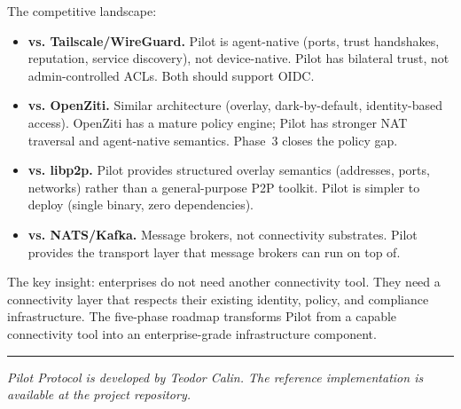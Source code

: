 \documentclass[11pt,a4paper]{article}
\begin{document}
The competitive landscape:
\begin{itemize}
    \item \textbf{vs. Tailscale/WireGuard.} Pilot is agent-native (ports, trust handshakes, reputation, service discovery), not device-native. Pilot has bilateral trust, not admin-controlled ACLs. Both should support OIDC.
    \item \textbf{vs. OpenZiti.} Similar architecture (overlay, dark-by-default, identity-based access). OpenZiti has a mature policy engine; Pilot has stronger NAT traversal and agent-native semantics. Phase~3 closes the policy gap.
    \item \textbf{vs. libp2p.} Pilot provides structured overlay semantics (addresses, ports, networks) rather than a general-purpose P2P toolkit. Pilot is simpler to deploy (single binary, zero dependencies).
    \item \textbf{vs. NATS/Kafka.} Message brokers, not connectivity substrates. Pilot provides the transport layer that message brokers can run on top of.
\end{itemize}

The key insight: enterprises do not need another connectivity tool. They need a connectivity layer that respects their existing identity, policy, and compliance infrastructure. The five-phase roadmap transforms Pilot from a capable connectivity tool into an enterprise-grade infrastructure component.

\vspace{2em}
\noindent\rule{\textwidth}{0.4pt}

\smallskip
\noindent\textit{Pilot Protocol is developed by Teodor Calin. The reference implementation is available at the project repository.}
\end{document}
